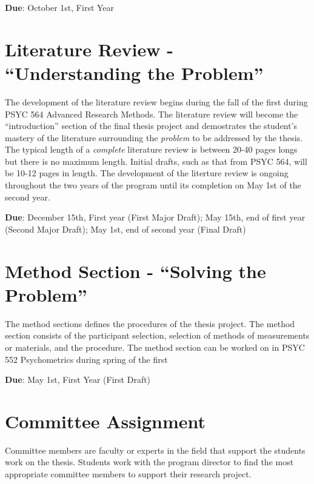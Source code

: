 \documentclass[openany]{book}
\begin{document}
\textbf{Due}: October 1st, First Year

\hypertarget{literature-review---understanding-the-problem}{%
\section{Literature Review - ``Understanding the Problem''}\label{literature-review---understanding-the-problem}}

The development of the literature review begins during the fall of the first during PSYC 564 Advanced Research Methods. The literature review will become the ``introduction'' section of the final thesis project and demostrates the student's mastery of the literature surrounding the \emph{problem} to be addressed by the thesis. The typical length of a \emph{complete} literature review is between 20-40 pages longs but there is no maximum length. Initial drafts, such as that from PSYC 564, will be 10-12 pages in length. The development of the literture review is ongoing throughout the two years of the program until its completion on May 1st of the second year.

\textbf{Due}: December 15th, First year (First Major Draft); May 15th, end of first year (Second Major Draft); May 1st, end of second year (Final Draft)

\hypertarget{method-section---solving-the-problem}{%
\section{Method Section - ``Solving the Problem''}\label{method-section---solving-the-problem}}

The method sections defines the procedures of the thesis project. The method section consists of the participant selection, selection of methods of measurements or materials, and the procedure. The method section can be worked on in PSYC 552 Psychometrics during spring of the first

\textbf{Due}: May 1st, First Year (First Draft)

\hypertarget{committee-assignment}{%
\section{Committee Assignment}\label{committee-assignment}}

Committee members are faculty or experts in the field that support the students work on the thesis. Students work with the program director to find the most appropriate committee members to support their research project.
\end{document}
